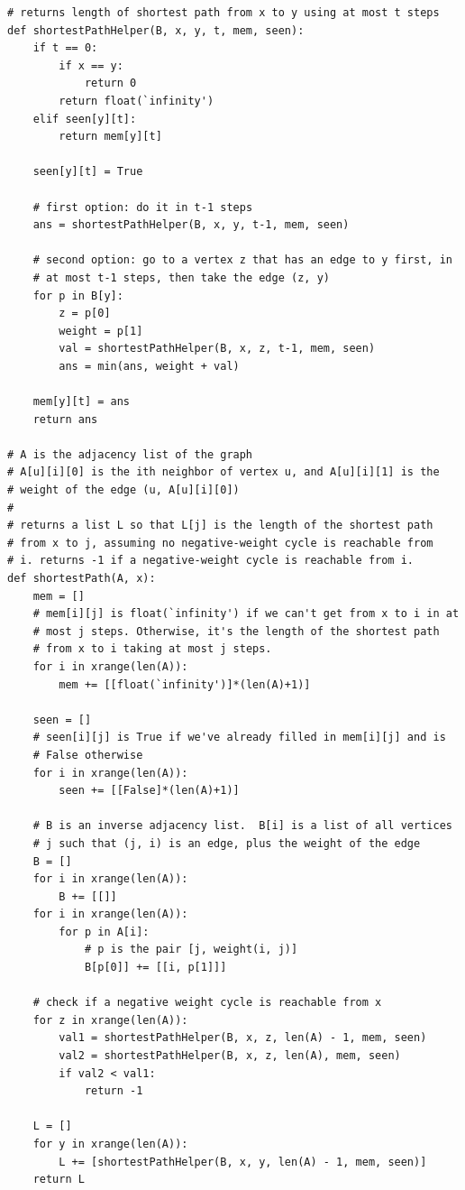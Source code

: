 \documentclass[11pt]{article}
\begin{document}
\begin{verbatim}
# returns length of shortest path from x to y using at most t steps
def shortestPathHelper(B, x, y, t, mem, seen):
    if t == 0:
        if x == y:
            return 0
        return float(`infinity')
    elif seen[y][t]:
        return mem[y][t]

    seen[y][t] = True

    # first option: do it in t-1 steps
    ans = shortestPathHelper(B, x, y, t-1, mem, seen)

    # second option: go to a vertex z that has an edge to y first, in
    # at most t-1 steps, then take the edge (z, y)
    for p in B[y]:
        z = p[0]
        weight = p[1]
        val = shortestPathHelper(B, x, z, t-1, mem, seen)
        ans = min(ans, weight + val)
  
    mem[y][t] = ans
    return ans

# A is the adjacency list of the graph
# A[u][i][0] is the ith neighbor of vertex u, and A[u][i][1] is the
# weight of the edge (u, A[u][i][0])
#
# returns a list L so that L[j] is the length of the shortest path
# from x to j, assuming no negative-weight cycle is reachable from
# i. returns -1 if a negative-weight cycle is reachable from i.
def shortestPath(A, x):
    mem = []
    # mem[i][j] is float(`infinity') if we can't get from x to i in at
    # most j steps. Otherwise, it's the length of the shortest path
    # from x to i taking at most j steps.
    for i in xrange(len(A)):
        mem += [[float(`infinity')]*(len(A)+1)]

    seen = []
    # seen[i][j] is True if we've already filled in mem[i][j] and is
    # False otherwise
    for i in xrange(len(A)):
        seen += [[False]*(len(A)+1)]

    # B is an inverse adjacency list.  B[i] is a list of all vertices
    # j such that (j, i) is an edge, plus the weight of the edge
    B = []
    for i in xrange(len(A)):
        B += [[]]
    for i in xrange(len(A)):
        for p in A[i]:
            # p is the pair [j, weight(i, j)]
            B[p[0]] += [[i, p[1]]]

    # check if a negative weight cycle is reachable from x
    for z in xrange(len(A)):
        val1 = shortestPathHelper(B, x, z, len(A) - 1, mem, seen)
        val2 = shortestPathHelper(B, x, z, len(A), mem, seen)
        if val2 < val1:
            return -1

    L = []
    for y in xrange(len(A)): 
        L += [shortestPathHelper(B, x, y, len(A) - 1, mem, seen)]
    return L
\end{verbatim}
\end{document}
